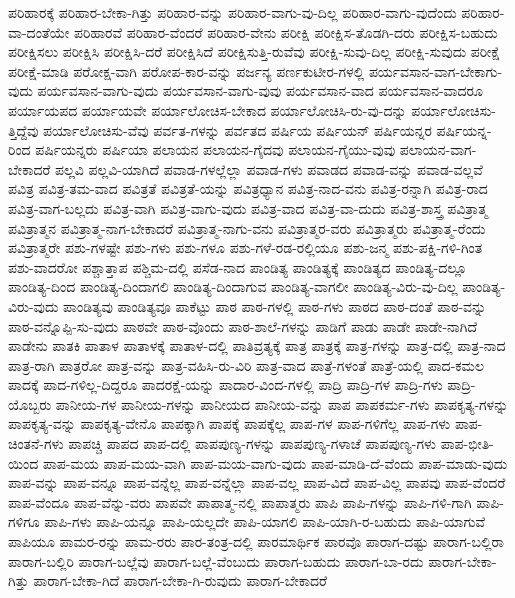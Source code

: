 {ಪರಿಹಾರಕ್ಕೆ
ಪರಿಹಾರ-ಬೇಕಾ-ಗಿತ್ತು
ಪರಿಹಾರ-ವನ್ನು
ಪರಿಹಾರ-ವಾಗು-ವು-ದಿಲ್ಲ
ಪರಿಹಾರ-ವಾಗು-ವುದೆಂದು
ಪರಿಹಾರ-ವಾ-ದಂತೆಯೇ
ಪರಿಹಾರವೆ
ಪರಿಹಾರ-ವೆಂದರೆ
ಪರಿಹಾರ-ವೇನು
ಪರೀಕ್ಷಿ
ಪರೀಕ್ಷಿಸ-ತೊಡಗಿ-ದರು
ಪರೀಕ್ಷಿಸ-ಬಹುದು
ಪರೀಕ್ಷಿಸಲು
ಪರೀಕ್ಷಿಸಿ
ಪರೀಕ್ಷಿಸಿ-ದರೆ
ಪರೀಕ್ಷಿಸಿದೆ
ಪರೀಕ್ಷಿಸುತ್ತಿ-ರುವೆವು
ಪರೀಕ್ಷಿ-ಸುವು-ದಿಲ್ಲ
ಪರೀಕ್ಷಿ-ಸುವುದು
ಪರೀಕ್ಷೆ
ಪರೀಕ್ಷೆ-ಮಾಡಿ
ಪರೋಕ್ಷ-ವಾಗಿ
ಪರೋಪ-ಕಾರ-ವನ್ನು
ಪರ್ಜನ್ಯ
ಪರ್ಣಕುಟೀರ-ಗಳಲ್ಲಿ
ಪರ್ಯವಸಾನ-ವಾಗ-ಬೇಕಾಗು-ವುದು
ಪರ್ಯವಸಾನ-ವಾಗು-ವುದು
ಪರ್ಯವಸಾನ-ವಾಗು-ವುವು
ಪರ್ಯವಸಾನ-ವಾದ
ಪರ್ಯವಸಾನ-ವಾದರೂ
ಪರ್ಯಾಯಪದ
ಪರ್ಯಾಯವೇ
ಪರ್ಯಾಲೋಚಿಸ-ಬೇಕಾದ
ಪರ್ಯಾಲೋಚಿಸಿ-ರು-ವು-ದನ್ನು
ಪರ್ಯಾಲೋಚಿಸು-ತ್ತಿದ್ದೆವು
ಪರ್ಯಾಲೋಚಿಸು-ವೆವು
ಪರ್ವತ-ಗಳನ್ನು
ಪರ್ವತದ
ಪರ್ಷಿಯ
ಪರ್ಷಿಯನ್
ಪರ್ಷಿಯನ್ನರ
ಪರ್ಷಿಯನ್ನ-ರಿಂದ
ಪರ್ಷಿಯನ್ನರು
ಪರ್ಷಿಯಾ
ಪಲಾಯನ
ಪಲಾಯನ-ಗೈದವು
ಪಲಾಯನ-ಗೈಯು-ವುವು
ಪಲಾಯನ-ವಾಗ-ಬೇಕಾದರೆ
ಪಲ್ಲವಿ
ಪಲ್ಲವಿ-ಯಾಗಿದೆ
ಪವಾಡ-ಗಳಲ್ಲೆಲ್ಲಾ
ಪವಾಡ-ಗಳು
ಪವಾಡದ
ಪವಾಡ-ವನ್ನು
ಪವಾಡ-ವಲ್ಲವೆ
ಪವಿತ್ರ
ಪವಿತ್ರ-ತಮ-ವಾದ
ಪವಿತ್ರತೆ
ಪವಿತ್ರತೆ-ಯನ್ನು
ಪವಿತ್ರಧ್ಯಾನ
ಪವಿತ್ರ-ನಾದ-ವನು
ಪವಿತ್ರ-ರನ್ನಾಗಿ
ಪವಿತ್ರ-ರಾದ
ಪವಿತ್ರ-ವಾಗ-ಬಲ್ಲದು
ಪವಿತ್ರ-ವಾಗಿ
ಪವಿತ್ರ-ವಾಗು-ವುದು
ಪವಿತ್ರ-ವಾದ
ಪವಿತ್ರ-ವಾ-ದುದು
ಪವಿತ್ರ-ಶಾಸ್ತ್ರ
ಪವಿತ್ರಾತ್ಮ
ಪವಿತ್ರಾತ್ಮನ
ಪವಿತ್ರಾತ್ಮ-ನಾಗ-ಬೇಕಾದರೆ
ಪವಿತ್ರಾತ್ಮ-ನಾಗು-ವನು
ಪವಿತ್ರಾತ್ಮರ-ವರು
ಪವಿತ್ರಾತ್ಮರು
ಪವಿತ್ರಾತ್ಮ-ರೆಂದು
ಪವಿತ್ರಾತ್ಮರೇ
ಪಶು-ಗಳಷ್ಟೇ
ಪಶು-ಗಳು
ಪಶು-ಗಳೂ
ಪಶು-ಗಳೆ-ರಡ-ರಲ್ಲಿಯೂ
ಪಶು-ಜನ್ಮ
ಪಶು-ಪಕ್ಷಿ-ಗಳಿ-ಗಿಂತ
ಪಶು-ವಾದರೋ
ಪಶ್ಚಾತ್ತಾಪ
ಪಶ್ಚಿಮ-ದಲ್ಲಿ
ಪಸೆಡ-ನಾದ
ಪಾಂಡಿತ್ಯ
ಪಾಂಡಿತ್ಯಕ್ಕೆ
ಪಾಂಡಿತ್ಯದ
ಪಾಂಡಿತ್ಯ-ದಲ್ಲೂ
ಪಾಂಡಿತ್ಯ-ದಿಂದ
ಪಾಂಡಿತ್ಯ-ದಿಂದಾಗಲಿ
ಪಾಂಡಿತ್ಯ-ದಿಂದಾಗುವ
ಪಾಂಡಿತ್ಯ-ವಾಗಲೀ
ಪಾಂಡಿತ್ಯ-ವಿರು-ವು-ದಿಲ್ಲ
ಪಾಂಡಿತ್ಯ-ವಿರು-ವುದು
ಪಾಂಡಿತ್ಯವು
ಪಾಂಡಿತ್ಯವೂ
ಪಾಕೆಟ್ಟು
ಪಾಠ
ಪಾಠ-ಗಳಲ್ಲಿ
ಪಾಠ-ಗಳು
ಪಾಠದ
ಪಾಠ-ದಂತೆ
ಪಾಠ-ವನ್ನು
ಪಾಠ-ವನ್ನೊಪ್ಪಿ-ಸು-ವುದು
ಪಾಠವೇ
ಪಾಠ-ವೊಂದು
ಪಾಠ-ಶಾಲೆ-ಗಳನ್ನು
ಪಾಡಿಗೆ
ಪಾಡು
ಪಾಡೇ
ಪಾಡೇ-ನಾಗಿದೆ
ಪಾಡೇನು
ಪಾತಕಿ
ಪಾತಾಳ
ಪಾತಾಳಕ್ಕೆ
ಪಾತಾಳ-ದಲ್ಲಿ
ಪಾತಿವ್ರತ್ಯಕ್ಕೆ
ಪಾತ್ರ
ಪಾತ್ರಕ್ಕೆ
ಪಾತ್ರ-ಗಳನ್ನು
ಪಾತ್ರ-ದಲ್ಲಿ
ಪಾತ್ರ-ನಾದ
ಪಾತ್ರ-ರಾಗಿ
ಪಾತ್ರರೋ
ಪಾತ್ರ-ವನ್ನು
ಪಾತ್ರ-ವಹಿಸಿ-ರು-ವಿರಿ
ಪಾತ್ರ-ವಾದ
ಪಾತ್ರೆ-ಗಳಂತೆ
ಪಾತ್ರೆ-ಯಲ್ಲಿ
ಪಾದ-ಕಮಲ
ಪಾದಕ್ಕೆ
ಪಾದ-ಗಳಿಲ್ಲ-ದಿದ್ದರೂ
ಪಾದರಕ್ಷೆ-ಯನ್ನು
ಪಾದಾರ-ವಿಂದ-ಗಳಲ್ಲಿ
ಪಾದ್ರಿ
ಪಾದ್ರಿ-ಗಳ
ಪಾದ್ರಿ-ಗಳು
ಪಾದ್ರಿ-ಯೊಬ್ಬರು
ಪಾನೀಯ-ಗಳ
ಪಾನೀಯ-ಗಳನ್ನು
ಪಾನೀಯದ
ಪಾನೀಯ-ವನ್ನು
ಪಾಪ
ಪಾಪಕರ್ಮ-ಗಳು
ಪಾಪಕೃತ್ಯ-ಗಳನ್ನು
ಪಾಪಕೃತ್ಯ-ವನ್ನು
ಪಾಪಕೃತ್ಯ-ವೇನೊ
ಪಾಪಕ್ಕಾಗಿ
ಪಾಪಕ್ಕೆ
ಪಾಪಕ್ಕೆಲ್ಲ
ಪಾಪ-ಗಳ
ಪಾಪ-ಗಳಿಗೆಲ್ಲ
ಪಾಪ-ಗಳು
ಪಾಪ-ಚಿಂತನೆ-ಗಳು
ಪಾಪಚ್ಚಿ
ಪಾಪದ
ಪಾಪ-ದಲ್ಲಿ
ಪಾಪಪುಣ್ಯ-ಗಳನ್ನು
ಪಾಪಪುಣ್ಯ-ಗಳಾಚೆ
ಪಾಪಪುಣ್ಯ-ಗಳು
ಪಾಪ-ಭೀತಿ-ಯಿಂದ
ಪಾಪ-ಮಯ
ಪಾಪ-ಮಯ-ವಾಗಿ
ಪಾಪ-ಮಯ-ವಾಗು-ವುದು
ಪಾಪ-ಮಾಡಿ-ದೆ-ವೆಂದು
ಪಾಪ-ಮಾಡು-ವುದು
ಪಾಪ-ವನ್ನು
ಪಾಪ-ವನ್ನೂ
ಪಾಪ-ವನ್ನೆಲ್ಲ
ಪಾಪ-ವನ್ನೆಲ್ಲಾ
ಪಾಪ-ವಲ್ಲ
ಪಾಪ-ವಿದೆ
ಪಾಪ-ವಿಲ್ಲ
ಪಾಪವು
ಪಾಪ-ವೆಂದರೆ
ಪಾಪ-ವೆಂದೂ
ಪಾಪ-ವೆನ್ನು-ವರು
ಪಾಪವೇ
ಪಾಪಾತ್ಮ-ನಲ್ಲಿ
ಪಾಪಾತ್ಮರು
ಪಾಪಿ
ಪಾಪಿ-ಗಳನ್ನು
ಪಾಪಿ-ಗಳಿ-ಗಾಗಿ
ಪಾಪಿ-ಗಳಿಗೂ
ಪಾಪಿ-ಗಳು
ಪಾಪಿ-ಯನ್ನೂ
ಪಾಪಿ-ಯಲ್ಲದೇ
ಪಾಪಿ-ಯಾಗಲಿ
ಪಾಪಿ-ಯಾಗಿ-ರ-ಬಹುದು
ಪಾಪಿ-ಯಾಗುವೆ
ಪಾಪಿಯೂ
ಪಾಮರ-ರನ್ನು
ಪಾಮ-ರರು
ಪಾರ-ತಂತ್ರ-ದಲ್ಲಿ
ಪಾರಮಾರ್ಥಿಕ
ಪಾರವೊ
ಪಾರಾಗ-ದಷ್ಟು
ಪಾರಾಗ-ಬಲ್ಲಿರಾ
ಪಾರಾಗ-ಬಲ್ಲಿರಿ
ಪಾರಾಗ-ಬಲ್ಲೆವು
ಪಾರಾಗ-ಬಲ್ಲೆ-ವೆಂಬುದು
ಪಾರಾಗ-ಬಹುದು
ಪಾರಾಗ-ಬಾ-ರದು
ಪಾರಾಗ-ಬೇಕಾ-ಗಿತ್ತು
ಪಾರಾಗ-ಬೇಕಾ-ಗಿದೆ
ಪಾರಾಗ-ಬೇಕಾ-ಗಿ-ರುವುದು
ಪಾರಾಗ-ಬೇಕಾದರೆ
}

